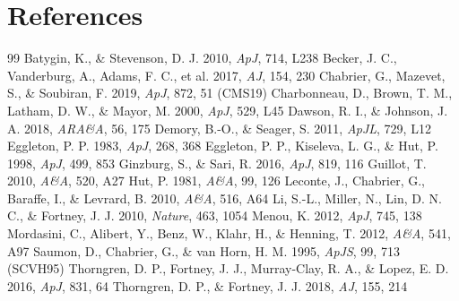 \section*{References}
\begin{thebibliography}{99}
 Batygin, K., \& Stevenson, D. J. 2010, \textit{ApJ}, 714, L238
 Becker, J. C., Vanderburg, A., Adams, F. C., et al. 2017, \textit{AJ}, 154, 230
 Chabrier, G., Mazevet, S., \& Soubiran, F. 2019, \textit{ApJ}, 872, 51 (CMS19)
 Charbonneau, D., Brown, T. M., Latham, D. W., \& Mayor, M. 2000, \textit{ApJ}, 529, L45
 Dawson, R. I., \& Johnson, J. A. 2018, \textit{ARA\&A}, 56, 175
 Demory, B.-O., \& Seager, S. 2011, \textit{ApJL}, 729, L12
 Eggleton, P. P. 1983, \textit{ApJ}, 268, 368
 Eggleton, P. P., Kiseleva, L. G., \& Hut, P. 1998, \textit{ApJ}, 499, 853
 Ginzburg, S., \& Sari, R. 2016, \textit{ApJ}, 819, 116
 Guillot, T. 2010, \textit{A\&A}, 520, A27
 Hut, P. 1981, \textit{A\&A}, 99, 126
 Leconte, J., Chabrier, G., Baraffe, I., \& Levrard, B. 2010, \textit{A\&A}, 516, A64
 Li, S.-L., Miller, N., Lin, D. N. C., \& Fortney, J. J. 2010, \textit{Nature}, 463, 1054
 Menou, K. 2012, \textit{ApJ}, 745, 138
 Mordasini, C., Alibert, Y., Benz, W., Klahr, H., \& Henning, T. 2012, \textit{A\&A}, 541, A97
 Saumon, D., Chabrier, G., \& van Horn, H. M. 1995, \textit{ApJS}, 99, 713 (SCVH95)
 Thorngren, D. P., Fortney, J. J., Murray-Clay, R. A., \& Lopez, E. D. 2016, \textit{ApJ}, 831, 64
 Thorngren, D. P., \& Fortney, J. J. 2018, \textit{AJ}, 155, 214
\end{thebibliography}
